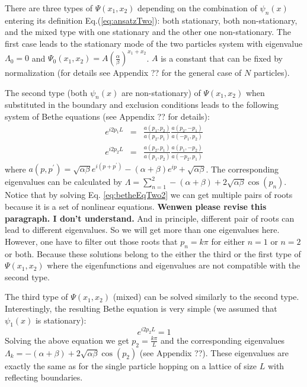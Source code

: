 \documentclass[aps,showpacs,twocolumn,floatfix,prx,superscriptaddress]{revtex4-1}
\begin{document}
There are three types of $\Psi(x_1, x_2)$ depending on the combination of $\psi_n(x)$ entering its definition Eq.(\ref{eq:ansatzTwo}): both stationary, both non-stationary, and the mixed type with one stationary and the other one non-stationary. The first case leads to the stationary mode of the two particles system with eigenvalue $\Lambda_0 = 0$ and $\Psi_0(x_1, x_2) = A \left(\frac{\alpha}{\beta}\right)^{x_1+x_2}$. $A$ is a constant that can be fixed by normalization (for details see Appendix ?? for the general case of $N$ particles).

The second type (both $\psi_n(x)$ are non-stationary) of $\Psi(x_1, x_2)$ when substituted in the boundary and exclusion conditions leads to the following system of Bethe equations \cite{} (see Appendix ?? for details):
\begin{subequations}
    \label{eq:betheEqTwo2}
    \begin{eqnarray}
        e^{i2p_1L} & = & \frac{a(p_1, p_2)}{a(p_2, p_1)} 
        \frac{a(p_2, -p_1)}{a(-p_1, p_2)}\\
        e^{i2p_2L} & = & \frac{a(p_2, p_1)}{a(p_1, p_2)} 
        \frac{a(p_1, -p_2)}{a(-p_2, p_1)}
    \end{eqnarray}
\end{subequations}
where $a(p, p^\prime) = \sqrt{\alpha\beta}e^{i(p+p^\prime)}-(\alpha+\beta)e^{ip}+\sqrt{\alpha\beta}$. 
The corresponding eigenvalues can be calculated by $\Lambda = \sum_{n=1}^2 -(\alpha+\beta)+2\sqrt{\alpha\beta}\cos(p_n)$. Notice that by solving Eq. \eqref{eq:betheEqTwo2} we can get multiple pairs of roots because it is a set of nonlinear equations. {\bf Wenwen please revise this paragraph. I don't understand.} And in principle, different pair of roots can lead to different eigenvalues. So we will get more than one eigenvalues here. However, one have to filter out those roots that $p_n = k\pi$ for either $n=1$ or $n=2$ or both. Because these solutions belong to the either the third or the first type of $\Psi(x_1, x_2)$ where the eigenfunctions and eigenvalues are not compatible with the second type.

The third type of $\Psi(x_1, x_2)$ (mixed) can be solved similarly to the second type. Interestingly, the resulting Bethe equation is very simple (we assumed that $\psi_1(x)$ is stationary):
\begin{equation}
    \label{eq:betheEqTwo1}
    e^{i2p_2L} = 1
\end{equation}
Solving the above equation we get $p_2 = \frac{k\pi}{L}$ and the corresponding eigenvalues $\Lambda_k = -(\alpha+\beta)+2\sqrt{\alpha\beta}\cos(p_2)$ (see Appendix ??). These eigenvalues are exactly the same as for the single particle hopping on a lattice of size $L$ with reflecting boundaries. 
\end{document}
